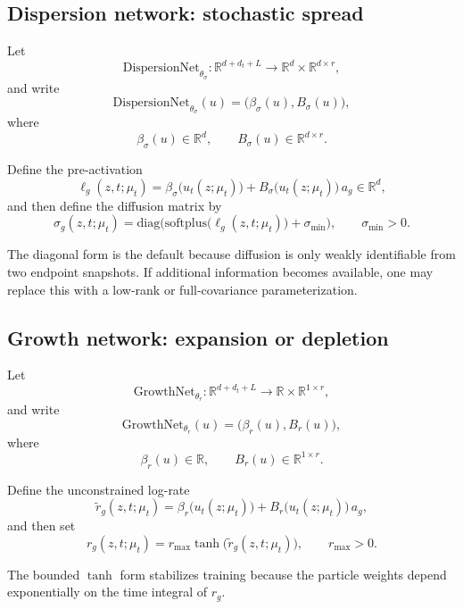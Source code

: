 \documentclass[11pt]{article}
\newcommand{\R}{\mathbb{R}}
\newcommand{\diag}{\mathrm{diag}}
\newcommand{\softplus}{\mathrm{softplus}}
\begin{document}
\subsection{Dispersion network: stochastic spread}

Let
\[
\mathrm{DispersionNet}_{\theta_\sigma} :
\R^{d+d_t+L}
\to
\R^d \times \R^{d\times r},
\]
and write
\[
\mathrm{DispersionNet}_{\theta_\sigma}(u)=\big(\beta_\sigma(u),B_\sigma(u)\big),
\]
where
\[
\beta_\sigma(u)\in\R^d,
\qquad
B_\sigma(u)\in\R^{d\times r}.
\]

Define the pre-activation
\begin{equation}
\ell_g(z,t;\mu_t)
=
\beta_\sigma\!\big(u_t(z;\mu_t)\big)
+
B_\sigma\!\big(u_t(z;\mu_t)\big)\,a_g
\in\R^d,
\label{eq:disp_preact}
\end{equation}
and then define the diffusion matrix by
\begin{equation}
\sigma_g(z,t;\mu_t)
=
\diag\!\Big(
\softplus\big(\ell_g(z,t;\mu_t)\big)+\sigma_{\min}
\Big),
\qquad
\sigma_{\min}>0.
\label{eq:diff_total}
\end{equation}

The diagonal form is the default because diffusion is only weakly identifiable from two endpoint snapshots. If additional information becomes available, one may replace this with a low-rank or full-covariance parameterization.

\subsection{Growth network: expansion or depletion}

Let
\[
\mathrm{GrowthNet}_{\theta_r} :
\R^{d+d_t+L}
\to
\R \times \R^{1\times r},
\]
and write
\[
\mathrm{GrowthNet}_{\theta_r}(u)=\big(\beta_r(u),B_r(u)\big),
\]
where
\[
\beta_r(u)\in\R,
\qquad
B_r(u)\in\R^{1\times r}.
\]

Define the unconstrained log-rate
\begin{equation}
\tilde r_g(z,t;\mu_t)
=
\beta_r\!\big(u_t(z;\mu_t)\big)
+
B_r\!\big(u_t(z;\mu_t)\big)\,a_g,
\label{eq:growth_preact}
\end{equation}
and then set
\begin{equation}
r_g(z,t;\mu_t)
=
r_{\max}\tanh\!\big(\tilde r_g(z,t;\mu_t)\big),
\qquad
r_{\max}>0.
\label{eq:growth_total}
\end{equation}

The bounded $\tanh$ form stabilizes training because the particle weights depend exponentially on the time integral of $r_g$.
\end{document}
